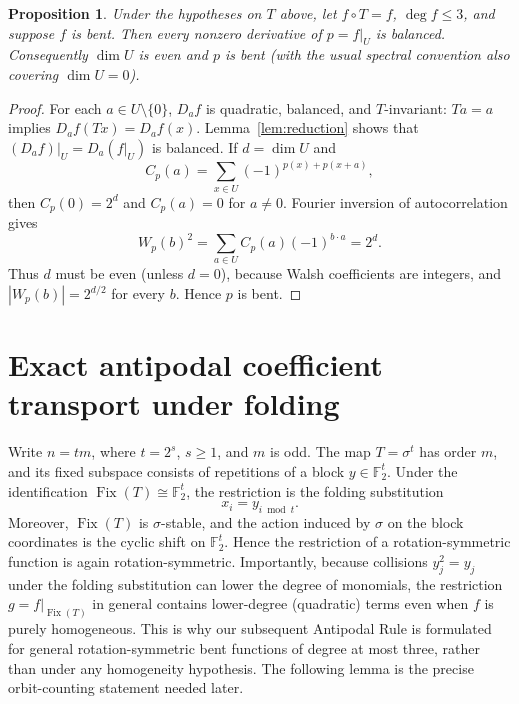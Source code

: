 \documentclass[11pt,a4paper]{article}
\newtheorem{proposition}[theorem]{Proposition}
\theoremstyle{remark}
\theoremstyle{plain}
\newcommand{\F}{\mathbb F_2}
\newcommand{\Fix}{\operatorname{Fix}}
\begin{document}
\begin{proposition}\label{prop:restriction}
Under the hypotheses on $T$ above, let $f\circ T=f$, $\deg f\le3$, and suppose $f$ is bent. Then every nonzero derivative of $p=f|_U$ is balanced. Consequently $\dim U$ is even and $p$ is bent (with the usual spectral convention also covering $\dim U=0$).
\end{proposition}
\begin{proof}
For each $a\in U\setminus\{0\}$, $D_af$ is quadratic, balanced, and $T$-invariant: $Ta=a$ implies $D_af(Tx)=D_af(x)$. Lemma~\ref{lem:reduction} shows that $(D_af)|_U=D_a(f|_U)$ is balanced. If $d=\dim U$ and
\[
C_p(a)=\sum_{x\in U}(-1)^{p(x)+p(x+a)},
\]
then $C_p(0)=2^d$ and $C_p(a)=0$ for $a\ne0$. Fourier inversion of autocorrelation gives
\[
W_p(b)^2=\sum_{a\in U}C_p(a)(-1)^{b\cdot a}=2^d.
\]
Thus $d$ must be even (unless $d=0$), because Walsh coefficients are integers, and $|W_p(b)|=2^{d/2}$ for every $b$. Hence $p$ is bent.
\end{proof}

\section{Exact antipodal coefficient transport under folding}
Write $n=tm$, where $t=2^s$, $s\ge1$, and $m$ is odd. The map $T=\sigma^t$ has order $m$, and its fixed subspace consists of repetitions of a block $y\in\F^t$. Under the identification $\Fix(T)\cong\F^t$, the restriction is the folding substitution
\[
x_i=y_{i\bmod t}.
\]
Moreover, $\Fix(T)$ is $\sigma$-stable, and the action induced by $\sigma$ on the block coordinates is the cyclic shift on $\F^t$. Hence the restriction of a rotation-symmetric function is again rotation-symmetric. Importantly, because collisions $y_j^2=y_j$ under the folding substitution can lower the degree of monomials, the restriction $g=f|_{\Fix(T)}$ in general contains lower-degree (quadratic) terms even when $f$ is purely homogeneous. This is why our subsequent Antipodal Rule is formulated for general rotation-symmetric bent functions of degree at most three, rather than under any homogeneity hypothesis. The following lemma is the precise orbit-counting statement needed later.
\end{document}
